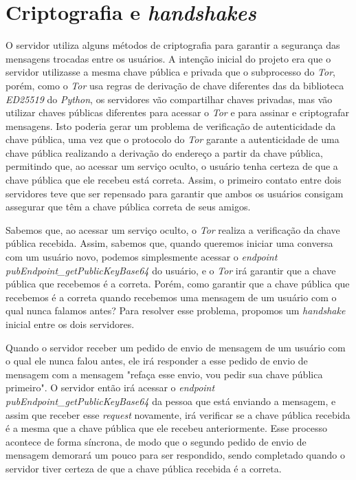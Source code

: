 \section{Criptografia e \textit{handshakes}}

O servidor utiliza alguns métodos de criptografia para garantir a segurança das mensagens trocadas entre os usuários. A intenção inicial do projeto era que o servidor utilizasse a mesma chave pública e privada que o subprocesso do \textit{Tor}, porém, como o \textit{Tor} usa regras de derivação de chave diferentes das da biblioteca \textit{ED25519} do \textit{Python}, os servidores vão compartilhar chaves privadas, mas vão utilizar chaves públicas diferentes para acessar o \textit{Tor} e para assinar e criptografar mensagens. Isto poderia gerar um problema de verificação de autenticidade da chave pública, uma vez que o protocolo do \textit{Tor} garante a autenticidade de uma chave pública realizando a derivação do endereço a partir da chave pública, permitindo que, ao acessar um serviço oculto, o usuário tenha certeza de que a chave pública que ele recebeu está correta. Assim, o primeiro contato entre dois servidores teve que ser repensado para garantir que ambos os usuários consigam assegurar que têm a chave pública correta de seus amigos.

Sabemos que, ao acessar um serviço oculto, o \textit{Tor} realiza a verificação da chave pública recebida. Assim, sabemos que, quando queremos iniciar uma conversa com um usuário novo, podemos simplesmente acessar o \textit{endpoint} \textit{pubEndpoint\_getPublicKeyBase64} do usuário, e o \textit{Tor} irá garantir que a chave pública que recebemos é a correta. Porém, como garantir que a chave pública que recebemos é a correta quando recebemos uma mensagem de um usuário com o qual nunca falamos antes? Para resolver esse problema, propomos um \textit{handshake} inicial entre os dois servidores.

Quando o servidor receber um pedido de envio de mensagem de um usuário com o qual ele nunca falou antes, ele irá responder a esse pedido de envio de mensagem com a mensagem "refaça esse envio, vou pedir sua chave pública primeiro". O servidor então irá acessar o \textit{endpoint} \textit{pubEndpoint\_getPublicKeyBase64} da pessoa que está enviando a mensagem, e assim que receber esse \textit{request} novamente, irá verificar se a chave pública recebida é a mesma que a chave pública que ele recebeu anteriormente. Esse processo acontece de forma síncrona, de modo que o segundo pedido de envio de mensagem demorará um pouco para ser respondido, sendo completado quando o servidor tiver certeza de que a chave pública recebida é a correta.

